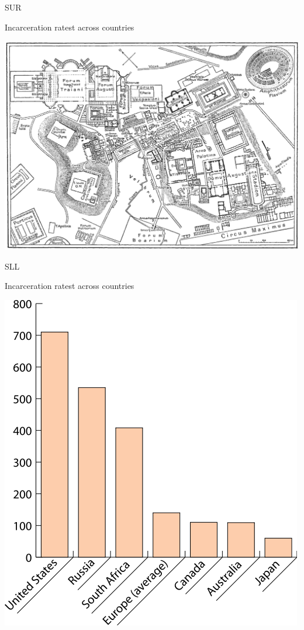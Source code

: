 \begin{chart}{S}{UR}
\caption{Incarceration ratest across countries}
\label{chart:incarceration}
\includegraphics[width=\chartwidth,height=\chartheight]{Rome}  
\end{chart}

\begin{chart}{S}{LL}
\caption{Incarceration ratest across countries}
\label{chart:incarceration}
\includegraphics[width=\chartwidth,height=\chartheight]{incarceration}  
\end{chart}

